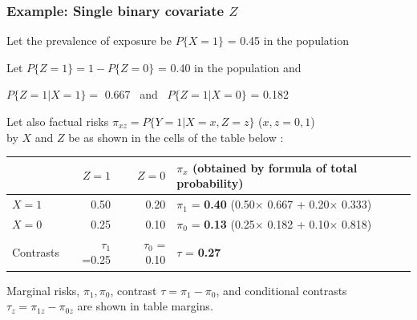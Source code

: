 \documentclass[12pt,dvipsnames,t,aspectratio=169, handout%
]{beamer}
\begin{document}
\begin{frame}
\frametitle{\large Example: Single binary covariate $Z$}

\bi
\item Let the prevalence of exposure be $P\{ X=1 \}$ = 0.45 in the population
\medskip
\item Let %
$P\{ Z=1 \} = 1 - P\{ Z=0 \}$ = 0.40 in the population and 
\begin{center}
 $P\{ Z=1|X=1\}=$ 0.667 \ and \ $P\{ Z=1| X=0\}$ = 0.182 
\end{center}
\pause
\medskip
\item Let also factual  risks $\pi_{xz} = P\{ Y=1|X=x, Z=z\}$ ($x,z=0,1$) \\
 by $X$ and $Z$ be as shown in the cells of the table below : 
\begin{center}
{\small
\begin{tabular}{l r r l}
\toprule
      & $Z=1$ & $Z=0$ & $\pi_x$ (obtained by formula of total probability) \\
\midrule						
$X=1$ & 0.50  & 0.20 & $\pi_1$ = \textbf{0.40} (0.50$\times$ 0.667 + 0.20$\times$ 0.333) \\
$X=0$ & 0.25  & 0.10 & $\pi_0$ = \textbf{0.13} (0.25$\times$ 0.182 + 0.10$\times$ 0.818) \\
\midrule
Contrasts & $\tau_1$ =0.25 & $\tau_0$ = 0.10 & $\tau$ = \textbf{0.27} \\
\bottomrule  
\end{tabular}
}
\end{center}
\pause
\medskip
\item %
 Marginal risks,
$\pi_1, \pi_0$,  contrast $\tau = \pi_1 - \pi_0$,
and conditional contrasts 
$\tau_z = \pi_{1z} - \pi_{0z}$ are shown in table margins.
\ei

\end{frame}
\end{document}
